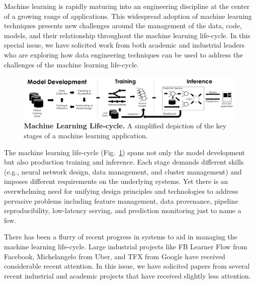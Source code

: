 \documentclass[11pt]{article}
\begin{document}
Machine learning is rapidly maturing into an engineering discipline at the center of a growing range of applications.
This widespread adoption of machine learning techniques presents new challenges around the management of the data, code, models, and their relationship throughout the machine learning life-cycle.
In this special issue, 
we have solicited work from both academic and industrial leaders 
who are exploring how data engineering techniques can be used to address the challenges of the machine learning life-cycle.




\begin{figure}[h]
\centering
\includegraphics[width=\textwidth]{letters/pipeline.pdf}
\caption{\small \textbf{Machine Learning Life-cycle.} A simplified depiction of the key stages of a machine learning application.}
\label{fig:mllc}
\end{figure}


The machine learning life-cycle (Fig.~\ref{fig:mllc}) spans not only the model development but also production training and inference.
Each stage demands different skills (e.g., neural network design, data management, and cluster management) and imposes different requirements on the underlying systems.
Yet there is an overwhelming need for unifying design principles and technologies to address pervasive problems including feature management, data provenance, pipeline reproducibility, low-latency serving, and prediction monitoring just to name a few.


There has been a flurry of recent progress in systems to aid in managing the machine learning life-cycle.  
Large industrial projects like 
FB Learner Flow 
from Facebook, 
Michelangelo 
from Uber, and 
TFX 
from Google have received considerable recent attention.  
In this issue, we have solicited papers from several recent industrial and academic projects that have received slightly less attention.
\end{document}
